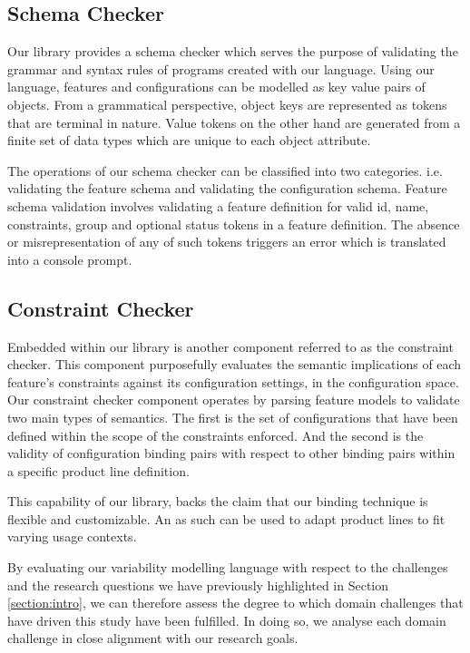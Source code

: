 \documentclass[conference]{IEEEtran}
\begin{document}
  \subsection{Schema Checker} Our library provides a schema checker which serves the purpose of validating the grammar and syntax rules of programs created with our language. Using our language, features and configurations can be modelled as key value pairs of objects. From a grammatical perspective, object keys are represented as tokens that are terminal in nature. Value tokens on the other hand are generated from a finite set of data types which are unique to each object attribute.
  
  The operations of our schema checker can be classified into two categories. i.e. validating the feature schema and validating the configuration schema. Feature schema validation involves validating a feature definition for valid id, name, constraints, group and optional status tokens in a feature definition. The absence or misrepresentation of any of such tokens triggers an error which is translated into a console prompt.
  
  \subsection{Constraint Checker} Embedded within our library is another component referred to as the constraint checker. This component purposefully evaluates the semantic implications of each feature's constraints against its configuration settings, in the configuration space. Our constraint checker component operates by parsing feature models to validate two main types of semantics. The first is the set of configurations that have been defined within the scope of the constraints enforced. And the second is the validity of configuration binding pairs with respect to other binding pairs within a specific product line definition.
  
  This capability of our library, backs the claim that our binding technique is flexible and customizable. An as such can be used to adapt product lines to fit varying usage contexts.


By evaluating our variability modelling language with respect to the challenges and the research questions we have previously highlighted in Section \ref{section:intro}, we can therefore assess the degree to which domain challenges that have driven this study have been fulfilled. In doing so, we analyse each domain challenge in close alignment with our research goals.
\end{document}

